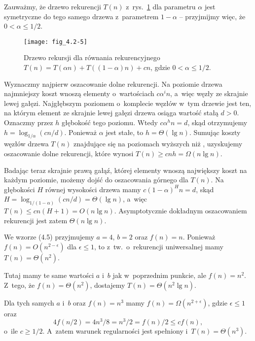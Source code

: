 \exercise %
Zauważmy, że drzewo rekurencji $T(n)$ z~rys.\ \ref{fig:4.2-5} dla parametru $\alpha$ jest symetryczne do tego samego drzewa z~parametrem $1-\alpha$ -- przyjmijmy więc, że $0<\alpha\le1/2$.
\begin{figure}[ht]
	\begin{center}
		\texttt{[image: fig\_4.2-5]}
	\end{center}
	\caption{Drzewo rekursji dla równania rekurencyjnego $T(n)=T(\alpha n)+T((1-\alpha)n)+cn$, gdzie $0<\alpha\le1/2$.} \label{fig:4.2-5}
\end{figure}

Wyznaczmy najpierw oszacowanie dolne rekurencji.
Na  poziomie drzewa najmniejszy koszt wnoszą elementy o~wartościach $c\alpha^in$, a~więc węzły ze skrajnie lewej gałęzi.
Najgłębszym poziomem o~komplecie węzłów w~tym drzewie jest ten, na którym element ze skrajnie lewej gałęzi drzewa osiąga wartość stałą $d>0$.
Oznaczmy przez $h$ głębokość tego poziomu.
Wtedy $c\alpha^hn=d$, skąd otrzymujemy $h=\log_{1/\alpha}(cn/d)$.
Ponieważ $\alpha$ jest stałe, to $h=\Theta(\lg n)$.
Sumując koszty węzłów drzewa $T(n)$ znajdujące się na poziomach wyższych niż , uzyskujemy oszacowanie dolne rekurencji, które wynosi $T(n)\ge cnh=\Omega(n\lg n)$.

Badając teraz skrajnie prawą gałąź, której elementy wnoszą największy koszt na każdym poziomie, możemy dojść do oszacowania górnego dla $T(n)$.
Na głębokości $H$ równej wysokości drzewa mamy $c(1-\alpha)^Hn=d$, skąd $H=\log_{1/(1-\alpha)}(cn/d)=\Theta(\lg n)$, a~więc $T(n)\le cn(H+1)=O(n\lg n)$.
Asymptotycznie dokładnym oszacowaniem rekurencji jest zatem $\Theta(n\lg n)$.


\exercise %

\subexercise
We wzorze (4.5) przyjmujemy $a=4$, $b=2$ oraz $f(n)=n$.
Ponieważ $f(n)=O(n^{2-\epsilon})$ dla $\epsilon\le1$, to z~tw.\ o~rekurencji uniwersalnej mamy $T(n)=\Theta(n^2)$.

\subexercise
Tutaj mamy te same wartości $a$ i~$b$ jak w~poprzednim punkcie, ale $f(n)=n^2$.
Z~tego, że $f(n)=\Theta(n^2)$, dostajemy $T(n)=\Theta(n^2\lg n)$.

\subexercise
Dla tych samych $a$ i~$b$ oraz $f(n)=n^3$ mamy $f(n)=\Omega(n^{2+\epsilon})$, gdzie $\epsilon\le1$ oraz
\[
	4f(n/2) = 4n^3\!/8 = n^3\!/2 = f(n)/2 \le cf(n),
\]
o~ile $c\ge1/2$.
A~zatem warunek regularności jest spełniony i~$T(n)=\Theta(n^3)$.


